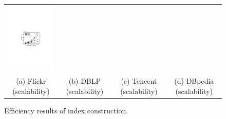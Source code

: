 \begin{figure}[htp]
\begin{tabular}{c c c c}
\begin{minipage}{3.76cm}
	\includegraphics[width=3.725cm]{figures/dbpedia-index}
  \end{minipage}
  \\
  \small (a) Flickr (scalability)
  &
  \small (b) DBLP (scalability)
  &
  \small (c) Tencent (scalability)
  &
  \small (d) DBpedia (scalability)
\end{tabular}
\caption{Efficiency results of index construction.}
\label{fig:exp-index}
\end{figure}



